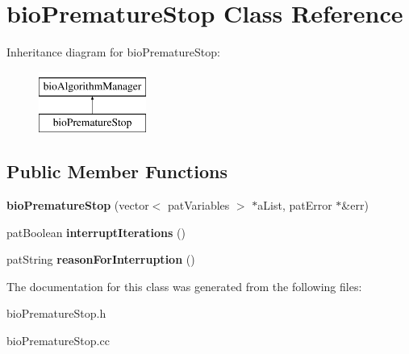 \hypertarget{classbio_premature_stop}{}\section{bio\+Premature\+Stop Class Reference}
\label{classbio_premature_stop}
Inheritance diagram for bio\+Premature\+Stop\+:\begin{figure}[H]
\begin{center}
\leavevmode
\includegraphics[height=2.000000cm]{classbio_premature_stop}
\end{center}
\end{figure}
\subsection*{Public Member Functions}
\begin{DoxyCompactItemize}
\item 
\mbox{\label{classbio_premature_stop_af5a7d47fc864368716b411c9d0f50706}} 
{\bfseries bio\+Premature\+Stop} (vector$<$ pat\+Variables $>$ $\ast$a\+List, pat\+Error $\ast$\&err)
\item 
\mbox{\label{classbio_premature_stop_a561f896568115aaa5d33f788e1c2c2f3}} 
pat\+Boolean {\bfseries interrupt\+Iterations} ()
\item 
\mbox{\label{classbio_premature_stop_ad44c89c83644f666a35047baf041039e}} 
pat\+String {\bfseries reason\+For\+Interruption} ()
\end{DoxyCompactItemize}


The documentation for this class was generated from the following files\+:\begin{DoxyCompactItemize}
\item 
bio\+Premature\+Stop.\+h\item 
bio\+Premature\+Stop.\+cc\end{DoxyCompactItemize}
